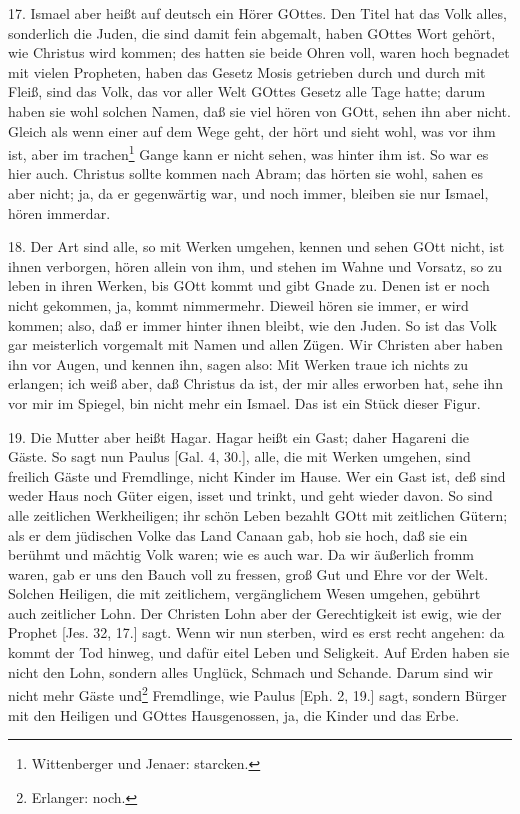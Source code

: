 17. Ismael aber heißt auf deutsch ein Hörer GOttes. Den Titel hat das Volk alles, sonderlich die Juden, die sind damit fein abgemalt, haben GOttes Wort gehört, wie Christus wird kommen; des hatten sie beide Ohren voll, waren hoch begnadet mit vielen Propheten, haben das Gesetz Mosis getrieben durch und durch mit Fleiß, sind das Volk, das vor aller Welt GOttes Gesetz alle Tage hatte; darum haben sie wohl solchen Namen, daß sie viel hören von GOtt, sehen ihn aber nicht. Gleich als wenn einer auf dem Wege geht, der hört und sieht wohl, was vor ihm ist, aber im trachen\footnote{Wittenberger und Jenaer: starcken.} Gange kann er nicht sehen, was hinter ihm ist. So war es hier auch. Christus sollte kommen nach Abram; das hörten sie wohl, sahen es aber nicht; ja, da er gegenwärtig war, und noch immer, bleiben sie nur Ismael, hören immerdar.

18. Der Art sind alle, so mit Werken umgehen, kennen und sehen GOtt nicht, ist ihnen verborgen, hören allein von ihm, und stehen im Wahne und Vorsatz, so zu leben in ihren Werken, bis GOtt kommt und gibt Gnade zu. Denen ist er noch nicht gekommen, ja, kommt nimmermehr. Dieweil hören sie immer, er wird kommen; also, daß er immer hinter ihnen bleibt, wie den Juden. So ist das Volk gar meisterlich vorgemalt mit Namen und allen Zügen. Wir Christen aber haben ihn vor Augen, und kennen ihn, sagen also: Mit Werken traue ich nichts zu erlangen; ich weiß aber, daß Christus da ist, der mir alles erworben hat, sehe ihn vor mir im Spiegel, bin nicht mehr ein Ismael. Das ist ein Stück dieser Figur.

19. Die Mutter aber heißt Hagar. Hagar heißt ein Gast; daher Hagareni die Gäste. So sagt nun Paulus [Gal. 4, 30.], alle, die mit Werken umgehen, sind freilich Gäste und Fremdlinge, nicht Kinder im Hause. Wer ein Gast ist, deß sind weder Haus noch Güter eigen, isset und trinkt, und geht wieder davon. So sind alle zeitlichen Werkheiligen; ihr schön Leben bezahlt GOtt mit zeitlichen Gütern; als er dem jüdischen Volke das Land Canaan gab, hob sie hoch, daß sie ein berühmt und mächtig Volk waren; wie es auch war. Da wir äußerlich fromm waren, gab er uns den Bauch voll zu fressen, groß Gut und Ehre vor der Welt. Solchen Heiligen, die mit zeitlichem, vergänglichem Wesen umgehen, gebührt auch zeitlicher Lohn. Der Christen Lohn aber der Gerechtigkeit ist ewig, wie der Prophet [Jes. 32, 17.] sagt.
Wenn wir nun sterben, wird es erst recht angehen: da kommt der Tod hinweg, und dafür eitel Leben und Seligkeit. Auf Erden haben sie nicht den Lohn, sondern alles Unglück, Schmach und Schande. Darum sind wir nicht mehr Gäste und\footnote{Erlanger: noch.} Fremdlinge, wie Paulus [Eph. 2, 19.] sagt, sondern Bürger mit den Heiligen und GOttes Hausgenossen, ja, die Kinder und das Erbe.

